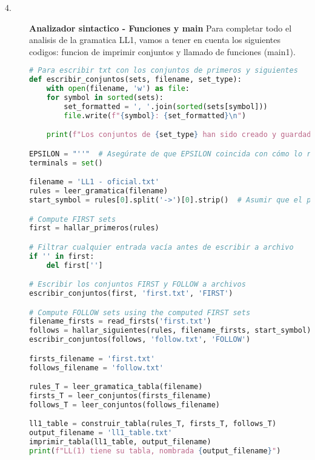 \documentclass{article}
\begin{document}
\begin{description}
\item[4. ] \textbf{Analizador sintactico - Funciones y main} Para completar todo el analisis de la gramatica LL1, vamos a tener en cuenta los siguientes codigos: funcion de imprimir conjuntos y llamado de funciones (main1).

\begin{lstlisting}[language=Python, caption=Funcion: Funcion de imprimir conjuntos y llamado de funciones (main1)]
# Para escribir txt con los conjuntos de primeros y siguientes
def escribir_conjuntos(sets, filename, set_type):
    with open(filename, 'w') as file:
    for symbol in sorted(sets):
        set_formatted = ', '.join(sorted(sets[symbol]))
        file.write(f"{symbol}: {set_formatted}\n")

    print(f"Los conjuntos de {set_type} han sido creado y guardado en {filename}")

EPSILON = "''"  # Asegúrate de que EPSILON coincida con cómo lo representas en las reglas
terminals = set()

filename = 'LL1 - oficial.txt'
rules = leer_gramatica(filename)
start_symbol = rules[0].split('->')[0].strip()  # Asumir que el primer no terminal es el símbolo de inicio

# Compute FIRST sets
first = hallar_primeros(rules)

# Filtrar cualquier entrada vacía antes de escribir a archivo
if '' in first:
    del first['']

# Escribir los conjuntos FIRST y FOLLOW a archivos
escribir_conjuntos(first, 'first.txt', 'FIRST')

# Compute FOLLOW sets using the computed FIRST sets
filename_firsts = read_firsts('first.txt')
follows = hallar_siguientes(rules, filename_firsts, start_symbol)
escribir_conjuntos(follows, 'follow.txt', 'FOLLOW')

firsts_filename = 'first.txt'
follows_filename = 'follow.txt'

rules_T = leer_gramatica_tabla(filename)
firsts_T = leer_conjuntos(firsts_filename)
follows_T = leer_conjuntos(follows_filename)

ll1_table = construir_tabla(rules_T, firsts_T, follows_T)
output_filename = 'll1_table.txt'
imprimir_tabla(ll1_table, output_filename)
print(f"LL(1) tiene su tabla, nombrada {output_filename}")
\end{lstlisting}
\end{description}
\end{document}
